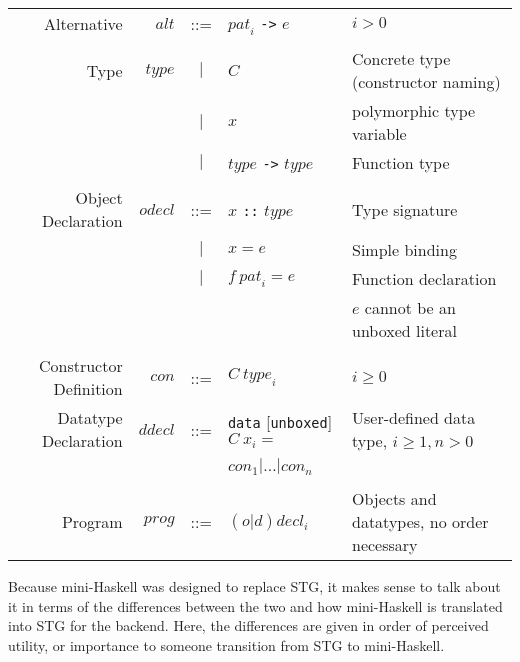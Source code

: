 \documentclass{llncs}
\begin{document}
\begin{table}
\begin{tabular}{r r c l l}
\\


Alternative        & $\mathit{alt}$      & ::= & $\mathit{pat}_i$ \texttt{->} $e$
& $i > 0$ \\

\\


Type               & $\mathit{type}$     & $|$ & $C$
& Concrete type (constructor naming) \\
                   &                     & $|$ & $x$
& polymorphic type variable \\
                   &                     & $|$ & $\mathit{type}$ \texttt{->} $\mathit{type}$
& Function type \\

\\


Object Declaration & $\mathit{odecl}$    & ::= & $x$ \texttt{::} $\mathit{type}$
& Type signature \\
                   &                     & $|$ & $x = e$
& Simple binding \\
                   &                     & $|$ & $f\ \mathit{pat}_i = e$
& Function declaration \\
                   &                     &     &
& $e$ cannot be an unboxed literal \\

\\


Constructor Definition & $\mathit{con}$  & ::= & $C\ \mathit{type}_i$
& $i \ge 0$ \\

Datatype Declaration &  $\mathit{ddecl}$ & ::= & \texttt{data} 
                                                 [\texttt{unboxed}]
                                                 $C\ x_i =$ 
& User-defined data type, $i \ge 1, n > 0$ \\
                     &                   &     & $\mathit{con}_1 | \dots |
                                                 \mathit{con}_n$
& \\

\\


Program                & $\mathit{prog}$ & ::= & $(o|d)\mathit{decl}_i$
& Objects and datatypes, no order necessary

\end{tabular}
\end{table}


Because mini-Haskell was designed to replace STG, it makes sense to talk about
it in terms of the differences between the two and how mini-Haskell is
translated into STG for the backend.  Here, the differences are given in order
of perceived utility, or importance to someone transition from STG to
mini-Haskell.
\end{document}
